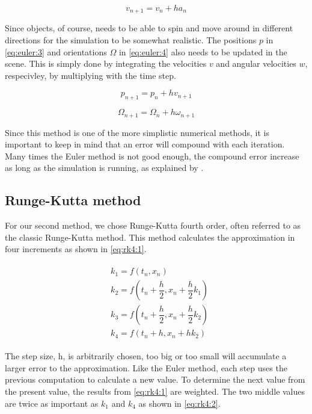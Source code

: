 \documentclass[a4paper,12pt]{report}
\begin{document}
\begin{equation}
v_{n+1}=v_n+ha_n
\label{eq:euler:2}
\end{equation}

Since objects, of course, needs to be able to spin and move around in different directions for the simulation to be somewhat realistic. The positions $p$ in \eqref{eq:euler:3} and orientations $\Omega$ in \eqref{eq:euler:4} also needs to be updated in the scene. This is simply done by integrating the velocities $v$ and angular velocities $w$, respecivley, by multiplying with the time step.

\begin{equation}
p_{n+1}=p_n+hv_{n+1}
\label{eq:euler:3}
\end{equation}

\begin{equation}
\Omega_{n+1}=\Omega_n+h\omega_{n+1}
\label{eq:euler:4}
\end{equation}

Since this method is one of the more simplistic numerical methods, it is important to keep in mind that an error will compound with each iteration. Many times the Euler method is not good enough, the compound error increase as long as the simulation is running, as explained by \cite{gog}.

\subsection{Runge-Kutta method}

For our second method, we chose Runge-Kutta fourth order, often referred to as the classic Runge-Kutta method. This method calculates the approximation in four increments as shown in \eqref{eq:rk4:1}.

\begin{equation}
\begin{split}
\begin{aligned}
& k_{1} = f(t_{n}, x_{n}) \\
& k_{2} = f(t_{n}+\dfrac{h}{2}, x_{n}+\dfrac{h}{2}k_{1}) \\
& k_{3} = f(t_{n}+\dfrac{h}{2}, x_{n}+\dfrac{h}{2}k_{2}) \\
& k_{4} = f(t_{n}+h, x_{n}+hk_{2})
\end{aligned}
\end{split}
\label{eq:rk4:1}
\end{equation}

The step size, h, is arbitrarily chosen, too big or too small will accumulate a larger error to the approximation. Like the Euler method, each step uses the previous computation to calculate a new value. To determine the next value from the present value, the results from \eqref{eq:rk4:1} are weighted. The two middle values are twice as important as $k_1$ and $k_4$ as shown in \eqref{eq:rk4:2}.
\end{document}
